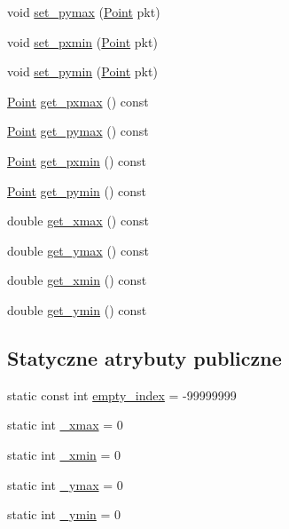\begin{DoxyCompactItemize}
\item 
void \hyperlink{class_grid_a51aaeb13d9c299ebc07e1e9d3b9fe47f}{set\+\_\+pymax} (\hyperlink{class_point}{Point} pkt)
\item 
void \hyperlink{class_grid_ab01ea11cdb5d87a4d8cddb51b40dd52c}{set\+\_\+pxmin} (\hyperlink{class_point}{Point} pkt)
\item 
void \hyperlink{class_grid_a666541ca159aebd16470f1fa7b2d16c2}{set\+\_\+pymin} (\hyperlink{class_point}{Point} pkt)
\item 
\hyperlink{class_point}{Point} \hyperlink{class_grid_ae90bb3028aa13b363d61e6617f4dbd89}{get\+\_\+pxmax} () const 
\item 
\hyperlink{class_point}{Point} \hyperlink{class_grid_ab45d29e63d5a92a97d2a8bc034e96234}{get\+\_\+pymax} () const 
\item 
\hyperlink{class_point}{Point} \hyperlink{class_grid_aa52105935ef29936395898215bcf40a7}{get\+\_\+pxmin} () const 
\item 
\hyperlink{class_point}{Point} \hyperlink{class_grid_a9865c790dde45934add338c055247a4c}{get\+\_\+pymin} () const 
\item 
double \hyperlink{class_grid_a2646150f8d14820de6c40a296d2eba17}{get\+\_\+xmax} () const 
\item 
double \hyperlink{class_grid_a385b11b22ff42896d522400d9ddd7e97}{get\+\_\+ymax} () const 
\item 
double \hyperlink{class_grid_a1ff74bf0898894452d67ccda6e3dc266}{get\+\_\+xmin} () const 
\item 
double \hyperlink{class_grid_ae776aec819443b168ebe15a52632ad77}{get\+\_\+ymin} () const 
\end{DoxyCompactItemize}
\subsection*{Statyczne atrybuty publiczne}
\begin{DoxyCompactItemize}
\item 
static const int \hyperlink{class_grid_a557878ff6ca7473b0a0acb3ae9c599cb}{empty\+\_\+index} = -\/99999999
\item 
static int \hyperlink{class_grid_a1f0576a19198685cba8f1067b7e1ba7c}{\+\_\+xmax} = 0
\item 
static int \hyperlink{class_grid_a293bb2eb514f57749e92d2dcf914ca57}{\+\_\+xmin} = 0
\item 
static int \hyperlink{class_grid_ab4c6a5500c2540b48194a7bcdefab235}{\+\_\+ymax} = 0
\item 
static int \hyperlink{class_grid_a6e548ba7ad924ef369c7fc24be04f0b2}{\+\_\+ymin} = 0
\end{DoxyCompactItemize}


